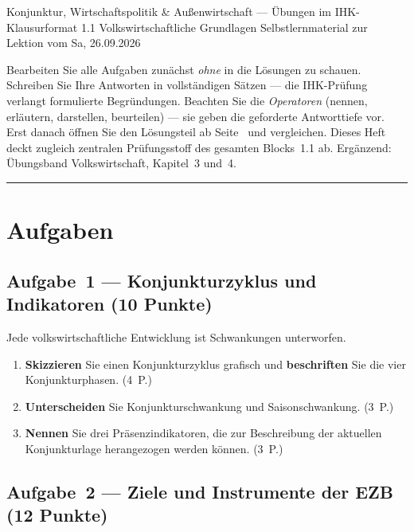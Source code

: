 \documentclass[11pt, a4paper]{article}
\begin{document}
%
  {Konjunktur, Wirtschaftspolitik \& Außenwirtschaft --- Übungen im IHK-Klausurformat}%
  {1.1 Volkswirtschaftliche Grundlagen}%
  {Selbstlernmaterial zur Lektion vom Sa, 26.09.2026}


\begin{merksatz}[title={\bfseries So nutzen Sie dieses Aufgabenheft}]
Bearbeiten Sie alle Aufgaben zunächst \emph{ohne} in die Lösungen zu schauen. Schreiben
Sie Ihre Antworten in vollständigen Sätzen --- die IHK-Prüfung verlangt formulierte
Begründungen. Beachten Sie die \emph{Operatoren} (nennen, erläutern, darstellen,
beurteilen) --- sie geben die geforderte Antworttiefe vor. Erst danach öffnen Sie
den Lösungsteil ab Seite~\pageref{loesungen} und vergleichen. Dieses Heft deckt zugleich
zentralen Prüfungsstoff des gesamten Blocks~1.1 ab. Ergänzend: Übungsband Volkswirtschaft,
Kapitel~3 und~4.
\end{merksatz}

\tableofcontents
\vspace{1em}
\hrule

\section{Aufgaben}

\subsection*{Aufgabe~1 --- Konjunkturzyklus und Indikatoren (10 Punkte)}

Jede volkswirtschaftliche Entwicklung ist Schwankungen unterworfen.

\begin{enumerate}[label=(\alph*)]
  \item \textbf{Skizzieren} Sie einen Konjunkturzyklus grafisch und \textbf{beschriften}
    Sie die vier Konjunkturphasen. \hfill (4~P.)
  \item \textbf{Unterscheiden} Sie Konjunkturschwankung und Saisonschwankung. \hfill (3~P.)
  \item \textbf{Nennen} Sie drei Präsenzindikatoren, die zur Beschreibung der aktuellen
    Konjunkturlage herangezogen werden können. \hfill (3~P.)
\end{enumerate}

\subsection*{Aufgabe~2 --- Ziele und Instrumente der EZB (12 Punkte)}
\end{document}
